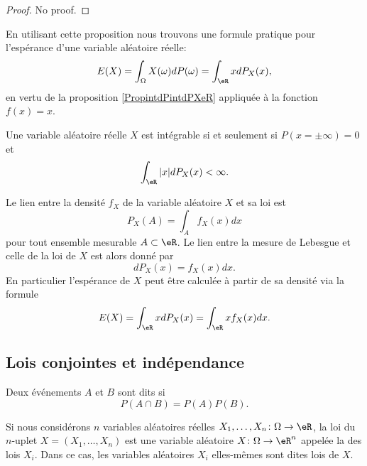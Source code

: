 \begin{proof}
    No proof.
\end{proof}

En utilisant cette proposition nous trouvons une formule pratique pour l'espérance d'une variable aléatoire réelle:
\begin{equation}
    E(X)=\int_{\Omega}X(\omega)dP(\omega)=\int_{\eR}xdP_X(x),
\end{equation}
en vertu de la proposition \ref{PropintdPintdPXeR} appliquée à la fonction \( f(x)=x\).

\begin{proposition}
    Une variable aléatoire réelle \( X\) est intégrable si et seulement si \( P(x=\pm\infty)=0\) et
    \begin{equation}
        \int_{\eR}| x |dP_X(x)<\infty.
    \end{equation}
\end{proposition}

Le lien entre la densité \( f_X\) de la variable aléatoire \( X\) et sa loi est
\begin{equation}
    P_X(A)=\int_Af_X(x)dx
\end{equation}
pour tout ensemble mesurable \( A\subset\eR\). Le lien entre la mesure de Lebesgue et celle de la loi de \( X\) est alors donné par
\begin{equation}
    dP_X(x)=f_X(x)dx.
\end{equation}
En particulier l'espérance de \( X\) peut être calculée à partir de sa densité via la formule
\begin{equation}        \label{EqEspDensform}
    E(X)=\int_{\eR}xdP_X(x)=\int_{\eR}x f_X(x)dx.
\end{equation}




\subsection{Lois conjointes et indépendance}

\begin{definition}
    Deux événements \( A\) et \( B\) sont dits  si
    \begin{equation}
        P(A\cap B)=P(A)P(B).
    \end{equation}
\end{definition}
Si nous considérons \( n\) variables aléatoires réelles \( X_1,\ldots,X_n\colon\Omega\to\eR\), la loi du \( n\)-uplet \( X=(X_1,\ldots,X_n)\) est une variable aléatoire \( X\colon \Omega\to \eR^n\) appelée la  des lois \( X_i\). Dans ce cas, les variables aléatoires \( X_i\) elles-mêmes sont dites lois  de \( X\).

